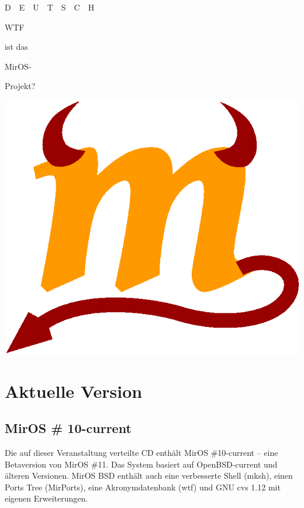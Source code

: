 \documentclass[a4paper,landscape,11pt,notumble]{leaflet}
\begin{document}

\graybox
\begin{center}
{\noindent{}%
\quad D~~E~~U~~T~~S~~C~~H\par}
\vfill

\fontsize{64}{64}\selectfont WTF\par
\fontsize{30}{30}\selectfont ist das\par
\fontsize{56}{56}\selectfont MirOS-\par
Projekt?\par

\vfill

\includegraphics[width=0.75\columnwidth]{img/m-color}

\vfill%
\end{center}%
\graybox

\newpage

\section{Aktuelle Version}

\subsection{MirOS \# 10-current}

Die auf dieser Veranstaltung verteilte CD enthält MirOS \#10-current -- eine Betaversion von MirOS \#11. Das System basiert auf OpenBSD-current und älteren Versionen. MirOS BSD enthält auch eine verbesserte Shell (mksh), einen Ports Tree (MirPorts), eine Akronymdatenbank (wtf) und GNU cvs 1.12 mit eigenen Erweiterungen.
\end{document}
